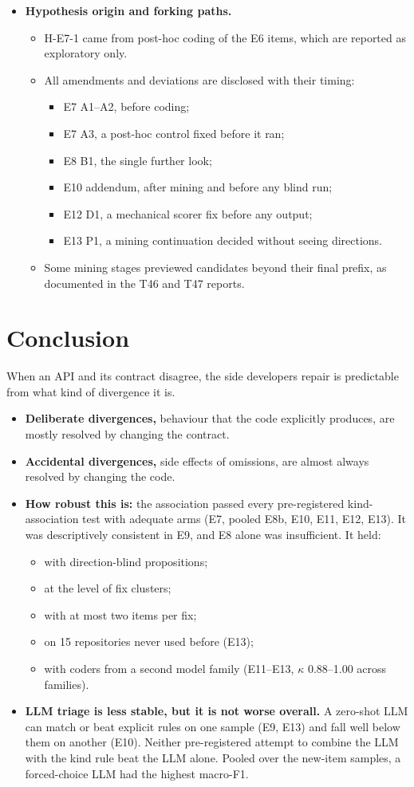 \documentclass[acmsmall,screen,review,anonymous]{acmart}
\begin{document}
\begin{itemize}
\item \textbf{Hypothesis origin and forking paths.}
\begin{itemize}
\item H-E7-1 came from post-hoc coding of the E6 items, which are reported as exploratory only.
\item All amendments and deviations are disclosed with their timing:
\begin{itemize}
\item E7 A1--A2, before coding;
\item E7 A3, a post-hoc control fixed before it ran;
\item E8 B1, the single further look;
\item E10 addendum, after mining and before any blind run;
\item E12 D1, a mechanical scorer fix before any output;
\item E13 P1, a mining continuation decided without seeing directions.
\end{itemize}
\item Some mining stages previewed candidates beyond their final prefix, as documented in the T46 and T47 reports.
\end{itemize}
\end{itemize}

\section{Conclusion}
When an API and its contract disagree, the side developers repair is predictable from what kind of divergence it is.
\begin{itemize}
\item \textbf{Deliberate divergences,} behaviour that the code explicitly produces, are mostly resolved by changing the contract.
\item \textbf{Accidental divergences,} side effects of omissions, are almost always resolved by changing the code.
\item \textbf{How robust this is:} the association passed every pre-registered kind-association test with adequate arms (E7, pooled E8b, E10, E11, E12, E13). It was descriptively consistent in E9, and E8 alone was insufficient. It held:
\begin{itemize}
\item with direction-blind propositions;
\item at the level of fix clusters;
\item with at most two items per fix;
\item on 15 repositories never used before (E13);
\item with coders from a second model family (E11--E13, $\kappa$ 0.88--1.00 across families).
\end{itemize}
\item \textbf{LLM triage is less stable, but it is not worse overall.} A zero-shot LLM can match or beat explicit rules on one sample (E9, E13) and fall well below them on another (E10). Neither pre-registered attempt to combine the LLM with the kind rule beat the LLM alone. Pooled over the new-item samples, a forced-choice LLM had the highest macro-F1.
\end{itemize}
\end{document}
